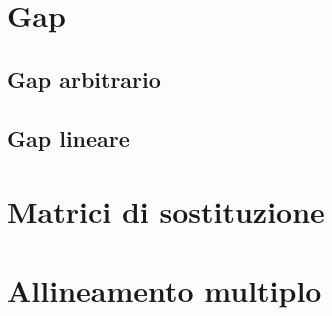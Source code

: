 \documentclass{article}
\begin{document}
\section{Gap}

\subsection{Gap arbitrario}

\subsection{Gap lineare}

\section{Matrici di sostituzione}

\section{Allineamento multiplo}
\end{document}
